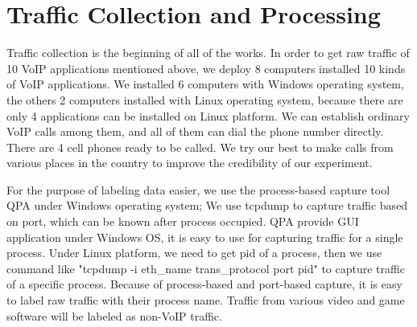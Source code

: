 \documentclass[conference]{IEEEtran}
\begin{document}

\section{Traffic Collection and Processing}
\label{sec:trafficcollectionandprocessing}
Traffic collection is the beginning of all of the works. In order to get raw traffic of 10 VoIP applications mentioned above, we deploy 8 computers installed 10 kinds of VoIP applications. We installed 6 computers with Windows operating system, the others 2 computers installed with Linux operating system, because there are only 4 applications can be installed on Linux platform. We can establish ordinary VoIP calls among them, and all of them can dial the phone number directly. There are 4 cell phones ready to be called. We try our best to make calls from various places in the country to improve the credibility of our experiment.



For the purpose of labeling data easier, we use the process-based capture tool QPA under Windows operating system; We use tcpdump to capture traffic based on port, which can be known after process occupied. QPA provide GUI application under Windows OS, it is easy to use for capturing traffic for a single process. Under Linux platform, we need to get pid of a process, then we use command like "tcpdump -i eth\_name trans\_protocol port pid" to capture traffic of a specific process. Because of process-based and port-based capture, it is easy to label raw traffic with their process name. Traffic from various video and game software will be labeled as non-VoIP traffic.
\end{document}
